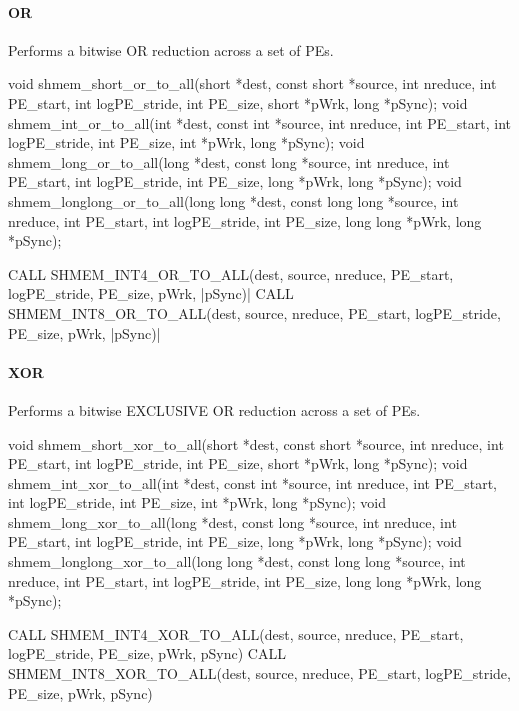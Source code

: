 \begin{apidefinition}
\paragraph{OR}
Performs a bitwise OR reduction across a set of \acp{PE}.\newline
\begin{Csynopsis}
void shmem_short_or_to_all(short *dest, const short *source, int nreduce, int PE_start, int logPE_stride, int PE_size, short *pWrk, long *pSync);
void shmem_int_or_to_all(int *dest, const int *source, int nreduce, int PE_start, int logPE_stride, int PE_size, int *pWrk, long *pSync);
void shmem_long_or_to_all(long *dest, const long *source, int nreduce, int PE_start, int logPE_stride, int PE_size, long *pWrk, long *pSync);
void shmem_longlong_or_to_all(long long *dest, const long long *source, int nreduce, int PE_start, int logPE_stride, int PE_size, long long *pWrk, long *pSync);
\end{Csynopsis}

\begin{Fsynopsis}
CALL SHMEM_INT4_OR_TO_ALL(dest, source, nreduce, PE_start, logPE_stride, PE_size, pWrk, |\mbox{pSync)}|
CALL SHMEM_INT8_OR_TO_ALL(dest, source, nreduce, PE_start, logPE_stride, PE_size, pWrk, |\mbox{pSync)}|
\end{Fsynopsis}

\paragraph{XOR}
Performs a bitwise EXCLUSIVE OR reduction across a set of \acp{PE}.\newline
\begin{Csynopsis}
void shmem_short_xor_to_all(short *dest, const short *source, int nreduce, int PE_start, int logPE_stride, int PE_size, short *pWrk, long *pSync);
void shmem_int_xor_to_all(int *dest, const int *source, int nreduce, int PE_start, int logPE_stride, int PE_size, int *pWrk, long *pSync);
void shmem_long_xor_to_all(long *dest, const long *source, int nreduce, int PE_start, int logPE_stride, int PE_size, long *pWrk, long *pSync);
void shmem_longlong_xor_to_all(long long *dest, const long long *source, int nreduce, int PE_start, int logPE_stride, int PE_size, long long *pWrk, long *pSync);
\end{Csynopsis}

\begin{Fsynopsis}
CALL SHMEM_INT4_XOR_TO_ALL(dest, source, nreduce, PE_start, logPE_stride, PE_size, pWrk, pSync)
CALL SHMEM_INT8_XOR_TO_ALL(dest, source, nreduce, PE_start, logPE_stride, PE_size, pWrk, pSync)
\end{Fsynopsis}


\end{apidefinition}
